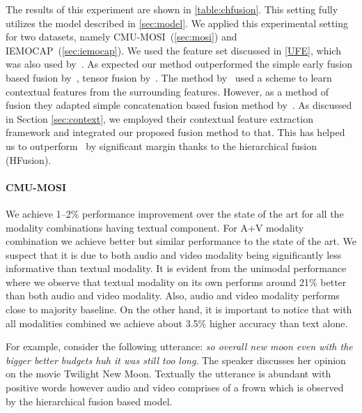 \documentclass[review]{elsarticle}
\newcommand\?[1]{\hl{#1}}
\begin{document}
The results of this experiment are shown in \cref{table:chfusion}. This setting
fully utilizes the model described in \cref{sec:model}. We applied this
experimental setting for two datasets, namely CMU-MOSI~(\cref{sec:mosi}) and
IEMOCAP~(\cref{sec:iemocap}). We used the feature set discussed in \cref{UFE},
which was also used by~\citet{porcon}. As expected our method outperformed the simple early fusion based fusion by~\citep{pordee}, tensor fusion by~\citep{zadten}. The method by~\citet{porcon} used a scheme to learn contextual features from the surrounding features. However, as a method of fusion they adapted simple concatenation based fusion method by~\citep{pordee}. As discussed in Section \ref{sec:context}, we employed their contextual feature extraction framework and integrated our proposed fusion method to that. This has helped us to outperform~\citet{porcon} by significant margin thanks to the hierarchical fusion (HFusion).

\paragraph{CMU-MOSI}
We achieve 1--2\% performance improvement over the state of the art
\citep{porcon} for all the modality combinations having textual
component. For A+V modality combination we achieve better but similar
performance to the state of the art. We suspect that it is due to both audio and
video modality being significantly less informative than textual modality. It is
evident from the unimodal performance where we observe that textual modality on
its own performs around 21\% better than both audio and video modality. Also,
audio and video modality performs close to majority baseline. On the other hand,
it is important to notice that with all modalities combined we achieve about
3.5\% higher accuracy than text alone.



For example, consider the following utterance: \emph{so overall new moon even with the bigger better budgets huh it was still too long}.
The speaker discusses her opinion on the movie Twilight New Moon. Textually the
utterance is abundant with positive words however audio and video comprises of a
frown which is observed by the hierarchical fusion based model.
\end{document}
